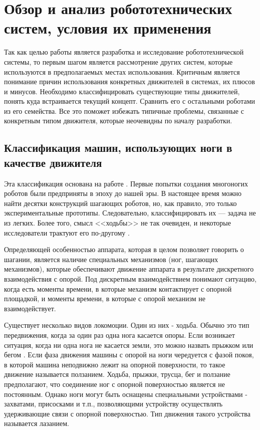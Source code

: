 \chapter{Обзор и анализ робототехнических систем, условия их применения}\label{ch:ch1}
Так как целью работы является разработка и исследование робототехнической системы, то первым шагом является рассмотрение других систем, которые используются в предполагаемых местах использования. Критичным является понимание причин использования конкретных движителей в системах, их плюсов и минусов. Необходимо классифицировать существующие типы движителей, понять куда встраивается текущий концепт. Сравнить его с остальными роботами из его семейства. Все это поможет избежать типичные проблемы, связанные с конкретным типом движителя, которые неочевидны по началу разработки.

\section{Классификация машин, использующих ноги в качестве движителя}
Эта классификация основана на работе \cite{Maloletov2015dinamica}. Первые попытки создания многоногих роботов были предприняты в эпоху до нашей эры. В настоящее время можно найти десятки конструкций шагающих роботов, но, как правило, это только экспериментальные прототипы. Следовательно, классифицировать их --- задача не из легких. Более того, смысл <<ходьбы>> не так очевиден, и некоторые исследователи трактуют его по-другому \cite{Bel1984,Brisk2009,Ohom1984,Pavl2013}. 

Определяющей особенностью аппарата, которая в целом позволяет говорить о шагании, является наличие специальных механизмов (ног, шагающих механизмов), которые обеспечивают движение аппарата в результате дискретного взаимодействия с опорой. Под дискретным взаимодействием понимают ситуацию, когда есть моменты времени, в которые механизм контактирует с опорной площадкой, и моменты времени, в которые с опорой механизм не взаимодействует.

Существует несколько видов локомоции. Один из них - ходьба. Обычно это тип передвижения, когда за один раз одна нога касается опоры. Если возникает ситуация, когда ни одна нога не касается земли, это можно назвать прыжком или бегом \cite{Ohom1984}. Если фаза движения машины с опорой на ноги чередуется с фазой покоя, в которой машина неподвижно лежит на опорной поверхности, то такое движение называется ползанием. Ходьба, прыжки, трусца, бег и ползание предполагают, что соединение ног с опорной поверхностью является не постоянным. Однако ноги могут быть оснащены специальными устройствами - захватами, присосками и т.п., позволяющими устройству осуществлять удерживающие связи с опорной поверхностью. Тип движения такого устройства называется лазанием.

